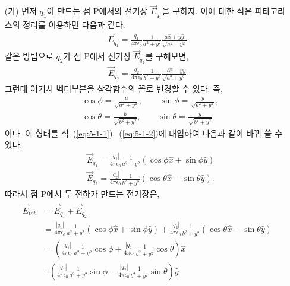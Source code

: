 \documentclass[tightenlines,floatfix,nofootinbib,superscriptaddress,fleqn]{revtex4-2}
\begin{document}
\begin{itemize}
\item[(가)] 
  먼저 $q_1$이 만드는 점 P에서의 전기장 $\vec{E}_{q_1}$을 구하자. 이에 대한 식은 피타고라스의 정리를 이용하면 다음과 같다.
  \begin{align}\label{eq:5-1-1}
    \vec{E}_{q_1}=\frac{q_1}{4\pi\epsilon_0}\frac{1}{a^2+y^2}\frac{a\hat{x}+y\hat{y}}{\sqrt{a^2+y^2}}
  \end{align}
  같은 방법으로 $q_2$가 점 P에서 전기장 $\vec{E}_{q_2}$를 구해보면,
  \begin{align}\label{eq:5-1-2}
    \vec{E}_{q_2}=\frac{q_2}{4\pi\epsilon_0}\frac{1}{b^2+y^2}\frac{-b\hat{x}+y\hat{y}}{\sqrt{a^2+y^2}}
  \end{align}
  그런데 여기서 벡터부분을 삼각함수의 꼴로 변경할 수 있다. 즉,
  \begin{align}\label{eq:5-1}
    &\cos{\phi}=\frac{a}{\sqrt{a^2+y^2}}, \qquad \sin{\phi}=\frac{y}{\sqrt{a^2+y^2}},\\
    &\cos{\theta}=\frac{b}{\sqrt{b^2+y^2}}, \qquad \sin{\theta}=\frac{y}{\sqrt{b^2+y^2}} 
  \end{align}
  이다. 이 형태를 식~(\ref{eq:5-1-1}),~(\ref{eq:5-1-2})에 대입하여 다음과 같이 바꿔 쓸 수 있다.
  \begin{align}
    &\vec{E}_{q_1}=\frac{\left|q_1\right|}{4\pi\epsilon_0}\frac{1}{a^2+y^2}\left(\cos{\phi}\hat{x}+\sin{\phi}\hat{y}\right)\\
    &\vec{E}_{q_2}=\frac{\left|q_2\right|}{4\pi\epsilon_0}\frac{1}{b^2+y^2}\left(\cos{\theta}\hat{x}-\sin{\theta}\hat{y}\right).
  \end{align}
  따라서 점 P에서 두 전하가 만드는 전기장은,
  \begin{align}\label{eq:5-2}
    \begin{split}
      \vec{E}_{tot}&=\vec{E}_{q_1}+\vec{E}_{q_2}\\
      &=\frac{\left|q_1\right|}{4\pi\epsilon_0}\frac{1}{a^2+y^2}\left(\cos{\phi}\hat{x}+\sin{\phi}\hat{y}\right)+
      \frac{\left|q_2\right|}{4\pi\epsilon_0}\frac{1}{b^2+y^2}\left(\cos{\theta}\hat{x}-\sin{\theta}\hat{y}\right)\\
      &=\left(\frac{\left|q_1\right|}{4\pi\epsilon_0}\frac{1}{a^2+y^2}\cos{\phi}+\frac{\left|q_2\right|}{4\pi\epsilon_0}\frac{1}{b^2+y^2}\cos{\theta}\right)\hat{x}\\
      &+\left(\frac{\left|q_1\right|}{4\pi\epsilon_0}\frac{1}{a^2+y^2}\sin{\phi}-\frac{\left|q_2\right|}{4\pi\epsilon_0}\frac{1}{b^2+y^2}\sin{\theta}\right)\hat{y}
    \end{split}

\end{align}
\end{itemize}
\end{document}
